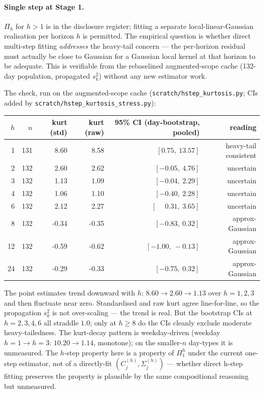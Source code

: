 \documentclass[11pt]{article}
\begin{document}
\paragraph{Single step at Stage 1.} \(\Pi_h\) for \(h > 1\) is in
the disclosure register; fitting a separate local-linear-Gaussian
realisation per horizon \(h\) is permitted. The empirical question
is whether direct multi-step fitting \emph{addresses} the heavy-tail
concern --- the per-horizon residual must actually be close to
Gaussian for a Gaussian local kernel at that horizon to be adequate.
This is verifiable from the rebaselined augmented-scope cache (132-day
population, propagated \(s_k^2\)) without any new estimator work.

The check, run on the augmented-scope cache
(\texttt{scratch/hstep\_kurtosis.py}; CIs added by
\texttt{scratch/hstep\_kurtosis\_stress.py}):
\begin{center}\small
\begin{tabular}{r r r r r r}
\toprule
\(h\) & \(n\) & kurt (std) & kurt (raw) & 95\% CI (day-bootstrap, pooled) & reading \\
\midrule
1  & 131 & 8.60  & 8.58  & \([0.75,\ 13.57]\) & heavy-tail consistent \\
2  & 132 & 2.60  & 2.62  & \([-0.05,\ 4.76]\) & uncertain \\
3  & 132 & 1.13  & 1.09  & \([-0.04,\ 2.29]\) & uncertain \\
4  & 132 & 1.06  & 1.10  & \([-0.40,\ 2.28]\) & uncertain \\
6  & 132 & 2.12  & 2.27  & \([\phantom{-}0.31,\ 3.65]\) & uncertain \\
8  & 132 & -0.34 & -0.35 & \([-0.83,\ 0.32]\) & approx-Gaussian \\
12 & 132 & -0.59 & -0.62 & \([-1.00,\ -0.13]\) & approx-Gaussian \\
24 & 132 & -0.29 & -0.33 & \([-0.75,\ 0.32]\) & approx-Gaussian \\
\bottomrule
\end{tabular}
\end{center}

The point estimates trend downward with \(h\):
\(8.60 \to 2.60 \to 1.13\) over \(h = 1{,}2{,}3\) and then fluctuate
near zero. Standardised and raw kurt agree line-for-line, so the
propagation \(s_k^2\) is not over-scaling --- the trend is real.
But the bootstrap CIs at \(h = 2,3,4,6\) all straddle \(1.0\); only
at \(h \geq 8\) do the CIs cleanly exclude moderate heavy-tailedness.
The kurt-decay pattern is weekday-driven (weekday \(h{=}1\to h{=}3\):
\(10.20\to 1.14\), monotone); on the smaller-\(n\) day-types it is
unmeasured. The \(h\)-step property here is a property of \(\Pi_1^h\)
under the current one-step estimator, not of a directly-fit
\((C_j^{(h)}, \Sigma_j^{(h)})\) --- whether direct h-step fitting
preserves the property is plausible by the same compositional
reasoning but unmeasured.
\end{document}

